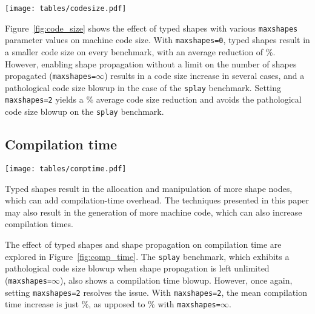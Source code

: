 \documentclass[preprint]{sigplanconf}
\newcommand{\percentstat}[1]{\unskip\%}
\begin{document}
\begin{figure*}[tb]
    \begin{center}
    \texttt{[image: tables/codesize.pdf]}
    \end{center}
\caption{Code size relative to inline cache baseline\label{fig:code_size}}
\end{figure*}

Figure~\ref{fig:code_size} shows the effect of typed shapes with various
{\tt maxshapes} parameter values on machine code size. With
{\tt maxshapes=0}, typed shapes result in a smaller code size on every
benchmark, with an average reduction of
\percentstat{codesize_decr_maxshapes0}. However, enabling shape propagation
without a limit on the number of shapes propagated ({\tt maxshapes=$\infty$})
results in a code size increase in several cases, and a pathological code
size blowup in the case of the {\tt splay} benchmark. Setting {\tt maxshapes=2}
yields a \percentstat{codesize_decr_maxshapes2} average code size reduction
and avoids the pathological code size blowup on the {\tt splay} benchmark.

\subsection{Compilation time}

\begin{figure*}[tb]
    \begin{center}
    \texttt{[image: tables/comptime.pdf]}
    \end{center}
\caption{Compilation time relative to inline cache baseline\label{fig:comp_time}}
\end{figure*}

Typed shapes result in the allocation and manipulation of more shape nodes,
which can add compilation-time overhead. The techniques
presented in this paper may also result in the generation of more
machine code, which can also increase compilation times. 

The effect of typed shapes and shape propagation on compilation time are
explored in Figure~\ref{fig:comp_time}. The {\tt splay} benchmark, which
exhibits a pathological code size blowup when shape propagation is left
unlimited ({\tt maxshapes=$\infty$}), also shows a compilation time blowup.
However, once again, setting {\tt maxshapes=2} resolves the issue.
With {\tt maxshapes=2}, the mean compilation time increase is just
\percentstat{comptime_incr_maxshapes2}, as upposed to
\percentstat{comptime_incr_maxshapesinfty} with {\tt maxshapes=$\infty$}.
\end{document}
